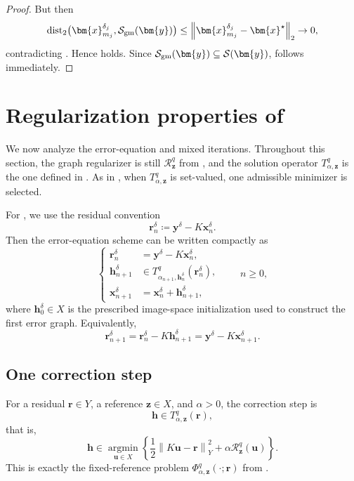 \documentclass{article}
\theoremstyle{remark}
\newcommand{\norm}[1]{\left\lVert #1 \right\rVert}
\newcommand{\Rreg}{\mathcal{R}}
\newcommand{\Ssol}{\mathcal{S}}
\newcommand{\bx}{{\bm{x}}}
\newcommand{\by}{{\bm{y}}}
\newcommand{\bz}{{\bm{z}}}
\newcommand{\bh}{{\bm{h}}}
\newcommand{\bu}{{\bm{u}}}
\newcommand{\br}{{\bm{r}}}
\begin{document}
\begin{proof}
But then
\[
\operatorname{dist}_2
\bigl(\bx_{m_j}^{\delta_j},\mathcal S_{\rm gm}(\by)\bigr)
\le
\norm{\bx_{m_j}^{\delta_j}-\bx^\star}_2
\to0,
\]
contradicting . Hence
 holds. Since
$\mathcal S_{\rm gm}(\by)\subseteq\Ssol(\by)$,
 follows immediately.
\end{proof}


\section{Regularization properties of \texorpdfstring{}{the error-equation and mixed iterative schemes}}\label{sec:convergence_error}

We now analyze the error-equation and mixed iterations. Throughout this section, the graph regularizer is still
\(\Rreg_\bz^q\) from , and the solution operator
\(T_{\alpha,\bz}^q\) is the one defined in
. As in , when
\(T_{\alpha,\bz}^q\) is set-valued, one admissible minimizer is selected.

For , we use the residual convention
\[
\br_n^\delta \coloneqq \by^\delta-K\bx_n^\delta .
\]
Then the error-equation scheme can be written compactly as
\begin{equation}\label{eq:error-scheme-shifted}
\left\{
\begin{aligned}
\br_n^\delta &= \by^\delta-K\bx_n^\delta,\\
\bh_{n+1}^\delta
&\in T_{\alpha_{n+1},\bh_n^\delta}^q(\br_n^\delta),\\
\bx_{n+1}^\delta
&=\bx_n^\delta+\bh_{n+1}^\delta,
\end{aligned}
\right.
\qquad n\ge0,
\end{equation}
where \(\bh_0^\delta\in X\) is the prescribed image-space initialization used to
construct the first error graph. Equivalently,
\[
\br_{n+1}^\delta
=
\br_n^\delta-K\bh_{n+1}^\delta
=
\by^\delta-K\bx_{n+1}^\delta .
\]

\subsection{One correction step}\label{sec:error-one-step}

For a residual \(\br\in Y\), a reference \(\bz\in X\), and
\(\alpha>0\), the correction step is
\[
\bh\in T_{\alpha,\bz}^q(\br),
\]
that is,
\[
\bh\in
\operatorname*{argmin}_{\bu\in X}
\left\{
\frac12\norm{K\bu-\br}_Y^2+\alpha\Rreg_\bz^q(\bu)
\right\}.
\]
This is exactly the fixed-reference problem
\(\Phi_{\alpha,\bz}^q(\cdot;\br)\) from
.
\end{document}
